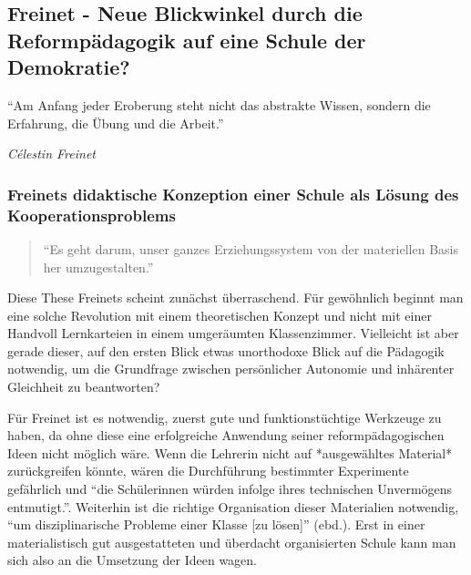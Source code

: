 \subsection{Freinet - Neue Blickwinkel durch die Reformpädagogik auf eine Schule der Demokratie?}

	\epigraph{
		``Am Anfang jeder Eroberung steht nicht das abstrakte Wissen, sondern die Erfahrung, die Übung und die Arbeit.''}
	{
		\emph{Célestin Freinet}
	}

\subsubsection{Freinets didaktische Konzeption einer Schule als Lösung des Kooperationsproblems}

	\begin{quote} ``Es geht darum, unser ganzes Erziehungssystem von der materiellen Basis her umzugestalten.''
		\cite[S.~99]{Freinet1979}
	\end{quote}

Diese These Freinets scheint zunächst überraschend.
Für gewöhnlich beginnt man eine solche Revolution mit einem theoretischen Konzept und nicht mit einer Handvoll Lernkarteien in einem umgeräumten Klassenzimmer.
Vielleicht ist aber gerade dieser, auf den ersten Blick etwas unorthodoxe Blick auf die Pädagogik notwendig, um die Grundfrage zwischen persönlicher Autonomie und inhärenter Gleichheit zu beantworten?

Für Freinet ist es notwendig, zuerst gute und funktionstüchtige Werkzeuge zu haben, da ohne diese eine erfolgreiche Anwendung seiner reformpädagogischen Ideen nicht möglich wäre.
Wenn die Lehrerin nicht auf *ausgewähltes Material* zurückgreifen könnte, wären die Durchführung bestimmter Experimente gefährlich und ``die Schülerinnen würden infolge ihres technischen Unvermögens entmutigt.''\citep[S.~98]{Freinet1979}.
Weiterhin ist die richtige Organisation dieser Materialien notwendig, ``um disziplinarische Probleme einer Klasse [zu lösen]'' (ebd.).
Erst in einer materialistisch gut ausgestatteten und überdacht organisierten Schule kann man sich also an die Umsetzung der Ideen wagen.

